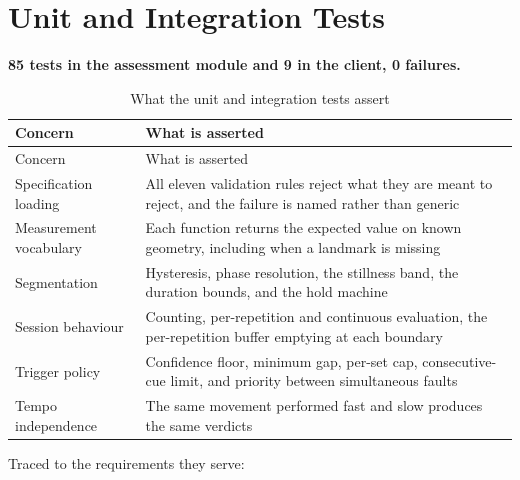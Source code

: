 \section{Unit and Integration Tests}
\label{sec:10.2}

\textbf{85 tests in the assessment module and 9 in the client, 0 failures.}

{\small
\setlength{\LTpre}{6pt}\setlength{\LTpost}{8pt}
\begin{longtable}{>{\raggedright\arraybackslash}p{}>{\raggedright\arraybackslash}p{}}
\caption{What the unit and integration tests assert}\\
\toprule
Concern & What is asserted \\
\midrule
\endfirsthead
\toprule
Concern & What is asserted \\
\midrule
\endhead
\bottomrule
\endfoot
\bottomrule
\endlastfoot
Specification loading & All eleven validation rules reject what they are meant to reject, and the failure is named rather than generic \\
Measurement vocabulary & Each function returns the expected value on known geometry, including when a landmark is missing \\
Segmentation & Hysteresis, phase resolution, the stillness band, the duration bounds, and the hold machine \\
Session behaviour & Counting, per-repetition and continuous evaluation, the per-repetition buffer emptying at each boundary \\
Trigger policy & Confidence floor, minimum gap, per-set cap, consecutive-cue limit, and priority between simultaneous faults \\
Tempo independence & The same movement performed fast and slow produces the same verdicts \\
\end{longtable}
}

Traced to the requirements they serve:

